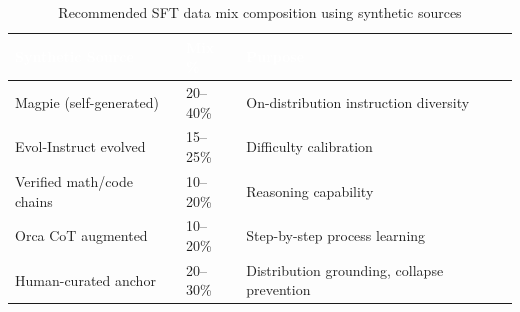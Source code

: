\begin{table}[H]
\centering\small\sffamily
{}
\begin{tabular}{L{3.5cm}L{2.5cm}L{5cm}}
\toprule
{}\textcolor{white}{\textbf{Synthetic Source}} & \textcolor{white}{\textbf{Mix \%}} & \textcolor{white}{\textbf{Purpose}} \\
\midrule
Magpie (self-generated) & 20--40\% & On-distribution instruction diversity \\
Evol-Instruct evolved & 15--25\% & Difficulty calibration \\
Verified math/code chains & 10--20\% & Reasoning capability \\
Orca CoT augmented & 10--20\% & Step-by-step process learning \\
Human-curated anchor & 20--30\% & Distribution grounding, collapse prevention \\
\bottomrule
\end{tabular}
\caption{Recommended SFT data mix composition using synthetic sources}
\end{table}


